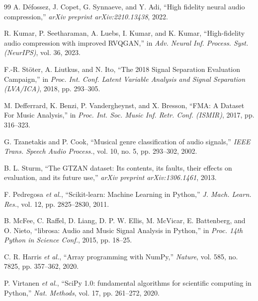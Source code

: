 \documentclass[twocolumn]{article}
\begin{document}
\begin{thebibliography}{99}
A. D\'efossez, J. Copet, G. Synnaeve, and Y. Adi,
``High fidelity neural audio compression,''
\textit{arXiv preprint arXiv:2210.13438}, 2022.

R. Kumar, P. Seetharaman, A. Luebs, I. Kumar, and K. Kumar,
``High-fidelity audio compression with improved RVQGAN,''
in \textit{Adv. Neural Inf. Process. Syst. (NeurIPS)}, vol. 36, 2023.

F.-R. St\"oter, A. Liutkus, and N. Ito,
``The 2018 Signal Separation Evaluation Campaign,''
in \textit{Proc. Int. Conf. Latent Variable Analysis and Signal Separation (LVA/ICA)}, 2018, pp. 293--305.

M. Defferrard, K. Benzi, P. Vandergheynst, and X. Bresson,
``FMA: A Dataset For Music Analysis,''
in \textit{Proc. Int. Soc. Music Inf. Retr. Conf. (ISMIR)}, 2017, pp. 316--323.

G. Tzanetakis and P. Cook,
``Musical genre classification of audio signals,''
\textit{IEEE Trans. Speech Audio Process.}, vol. 10, no. 5, pp. 293--302, 2002.

B. L. Sturm,
``The GTZAN dataset: Its contents, its faults, their effects on evaluation, and its future use,''
\textit{arXiv preprint arXiv:1306.1461}, 2013.

F. Pedregosa \textit{et al.},
``Scikit-learn: Machine Learning in Python,''
\textit{J. Mach. Learn. Res.}, vol. 12, pp. 2825--2830, 2011.

B. McFee, C. Raffel, D. Liang, D. P. W. Ellis, M. McVicar, E. Battenberg, and O. Nieto,
``librosa: Audio and Music Signal Analysis in Python,''
in \textit{Proc. 14th Python in Science Conf.}, 2015, pp. 18--25.

C. R. Harris \textit{et al.},
``Array programming with NumPy,''
\textit{Nature}, vol. 585, no. 7825, pp. 357--362, 2020.

P. Virtanen \textit{et al.},
``SciPy 1.0: fundamental algorithms for scientific computing in Python,''
\textit{Nat. Methods}, vol. 17, pp. 261--272, 2020.

\end{thebibliography}
\end{document}
